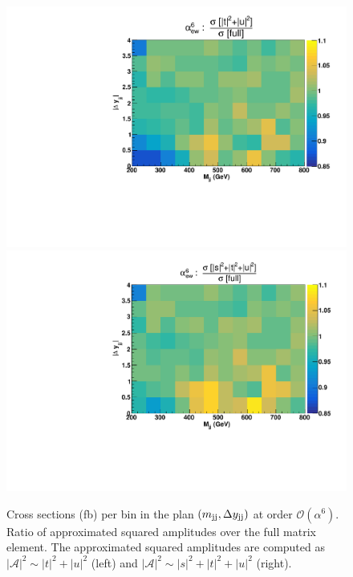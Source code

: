 





\begin{figure}[hbt]
\centering
\includegraphics[scale=0.395]{figures/scanfigures/ratio_tu.pdf}
\includegraphics[scale=0.395]{figures/scanfigures/ratio_stu.pdf}
\caption{Cross sections (fb) per bin in the plan $\left(m_{\text{j}\text{j}}, \Delta y_{\text{j}\text{j}}\right)$ at order $\mathcal{O}(\alpha^6)$.
Ratio of approximated squared amplitudes over the full matrix element. The approximated squared amplitudes are computed as $|\mathcal{A}|^2 \sim |t|^2 + |u|^2$ (left) and $|\mathcal{A}|^2 \sim |s|^2 + |t|^2 + |u|^2$ (right).}
\label{fig:ratio2d_LO}
\end{figure}

